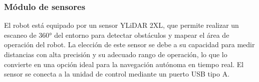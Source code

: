     \subsubsection{M\'odulo de sensores} %
    \label{ssub:modsen}
    El robot está equipado por un sensor YLiDAR 2XL, que permite realizar un escaneo de
    360° del entorno para detectar obstáculos y mapear el área de operación del robot. La
    elección de este sensor se debe a su capacidad para medir distancias con alta
    precisión y su adecuado rango de operación, lo que lo convierte en una opción ideal
    para la navegación autónoma en tiempo real.
    El sensor se conecta a la unidad de control mediante un puerto USB tipo A.

